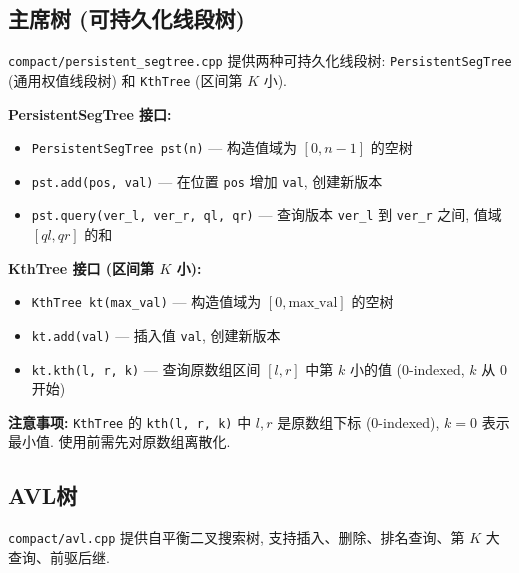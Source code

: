 \documentclass[a4paper]{ctexbook}
\begin{document}


\subsection{主席树 (可持久化线段树)}

\texttt{compact/persistent\_segtree.cpp} 提供两种可持久化线段树: \texttt{PersistentSegTree} (通用权值线段树) 和 \texttt{KthTree} (区间第 $K$ 小).

\textbf{PersistentSegTree 接口:}
\begin{itemize}
	\item \texttt{PersistentSegTree pst(n)} — 构造值域为 $[0, n-1]$ 的空树
	\item \texttt{pst.add(pos, val)} — 在位置 \texttt{pos} 增加 \texttt{val}, 创建新版本
	\item \texttt{pst.query(ver\_l, ver\_r, ql, qr)} — 查询版本 \texttt{ver\_l} 到 \texttt{ver\_r} 之间, 值域 $[ql, qr]$ 的和
\end{itemize}

\textbf{KthTree 接口 (区间第 $K$ 小):}
\begin{itemize}
	\item \texttt{KthTree kt(max\_val)} — 构造值域为 $[0, \text{max\_val}]$ 的空树
	\item \texttt{kt.add(val)} — 插入值 \texttt{val}, 创建新版本
	\item \texttt{kt.kth(l, r, k)} — 查询原数组区间 $[l, r]$ 中第 $k$ 小的值 (0-indexed, $k$ 从 0 开始)
\end{itemize}

\textbf{注意事项:} \texttt{KthTree} 的 \texttt{kth(l, r, k)} 中 $l, r$ 是原数组下标 (0-indexed), $k=0$ 表示最小值. 使用前需先对原数组离散化.



\subsection{AVL树}

\texttt{compact/avl.cpp} 提供自平衡二叉搜索树, 支持插入、删除、排名查询、第 $K$ 大查询、前驱后继.
\end{document}
